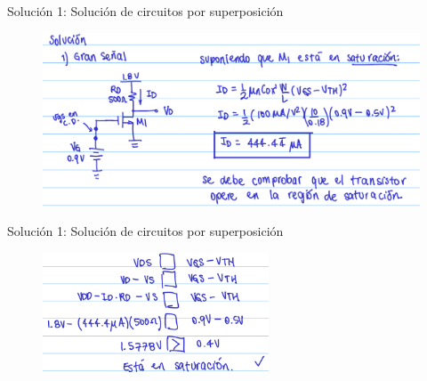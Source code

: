 \documentclass[t,aspectratio=169]{beamer}
\begin{document}
\begin{frame}{Solución 1: Solución de circuitos por superposición}

\begin{figure}[H]
    \centering
    \includegraphics[width=\textwidth]{figuras/ejemplo_1_2.png}
\end{figure}

\end{frame}


\begin{frame}{Solución 1: Solución de circuitos por superposición}

\begin{figure}[H]
    \centering
    \includegraphics[width=0.6\textwidth]{figuras/ejemplo_1_3.png}
\end{figure}

\end{frame}
\end{document}
